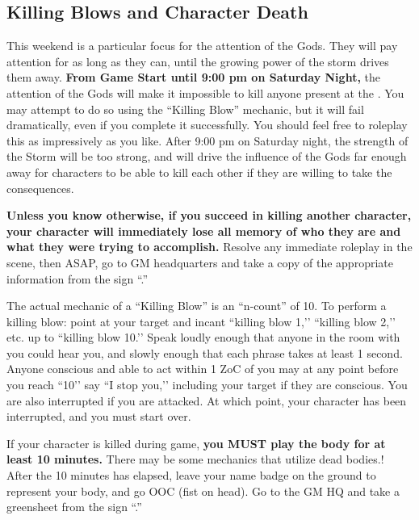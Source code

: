 \documentclass[sheet]{GL2020}
\begin{document}
\subsection{Killing Blows and Character Death}

This weekend is a particular focus for the attention of the Gods. They will pay attention for as long as they can, until the growing power of the storm drives them away. \textbf{From Game Start until 9:00 pm on Saturday Night,} the attention of the Gods will make it impossible to kill anyone present at the \pSc{}. You may attempt to do so using the ``Killing Blow'' mechanic, but it will fail dramatically, even if you complete it successfully. You should feel free to roleplay this as impressively as you like. After 9:00 pm on Saturday night, the strength of the Storm will be too strong, and will drive the influence of the Gods far enough away for characters to be able to kill each other if they are willing to take the consequences.


\textbf{Unless you know otherwise, if you succeed in killing another character, your character will immediately lose all memory of who they are and what they were trying to accomplish.} Resolve any immediate roleplay in the scene, then ASAP, go to GM headquarters and take a copy of the appropriate information from the sign ``\sMurderConsequences{}.''

The actual mechanic of a ``Killing Blow'' is an ``n-count'' of 10. To perform a killing blow: point at your target and incant ``killing blow 1,'’ ``killing blow 2,'’ etc. up to ``killing blow 10.'’ Speak loudly enough that anyone in the room with you could hear you, and slowly enough that each phrase takes at least 1 second. Anyone conscious and able to act within 1 ZoC of you may at any point before you reach ``10'’ say ``I stop you,'’ including your target if they are conscious. You are also interrupted if you are attacked. At which point, your character has been interrupted, and you must start over.

If your character is killed during game, \textbf{you MUST play the body for at least 10 minutes.} There may be some mechanics that utilize dead bodies.! After the 10 minutes has elapsed, leave your name badge on the ground to represent your body, and go OOC (fist on head). Go to the GM HQ and take a greensheet from the sign ``\sMurdered{}.''
\end{document}

